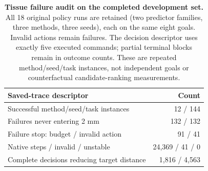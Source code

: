 \begin{table}[t]
\centering
\fontsize{9}{11}\selectfont
\setlength{\tabcolsep}{7pt}
\begin{tabular}{lr}
\toprule
Saved-trace descriptor & Count \\
\midrule
Successful method/seed/task instances & 12 / 144 \\
Failures never entering 2 mm & 132 / 132 \\
Failure stop: budget / invalid action & 91 / 41 \\
Native steps / invalid / unstable & 24,369 / 41 / 0 \\
Complete decisions reducing target distance & 1,816 / 4,563 \\
\bottomrule
\end{tabular}
\caption{\textbf{Tissue failure audit on the completed development set.}
All 18 original policy runs are retained (two predictor families, three methods,
three seeds), each on the same eight goals. Invalid actions remain failures.
The decision descriptor uses exactly five executed commands; partial terminal
blocks remain in outcome counts. These are repeated method/seed/task instances,
not independent goals or counterfactual candidate-ranking measurements.}
\label{tab:extension-tissue-failure-audit}
\end{table}
